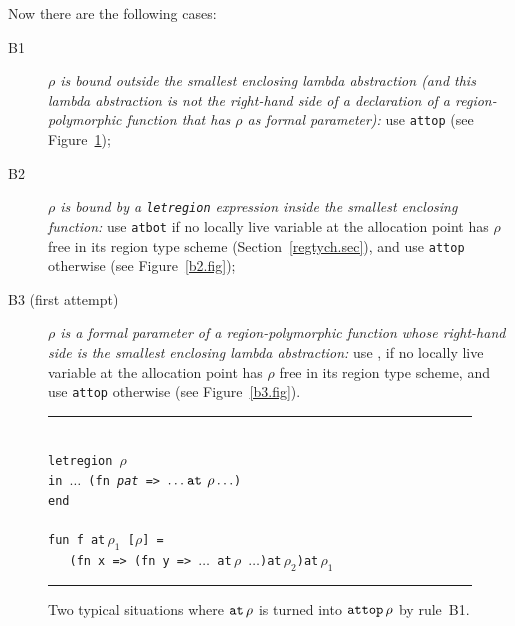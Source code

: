 \documentclass[12pt]{book}
\begin{document}
Now there are the following cases:
\begin{description}
\item[B1] {\it $\rho$ is bound outside the smallest enclosing lambda abstraction
      (and this lambda abstraction is not the right-hand side of a 
      declaration of a region-polymorphic function that has $\rho$ as
      formal parameter):}
      use {\tt attop} (see Figure~\ref{b1.fig});
\item[B2]{\it $\rho$ is bound by a {\tt letregion} expression inside the
      smallest enclosing function:} use {\tt atbot} if no locally live
      variable at the allocation point has $\rho$ free in its region 
      type scheme (Section~\ref{regtych.sec}), and use {\tt attop} otherwise 
      (see Figure~\ref{b2.fig});
    \item[B3 (first attempt)]{\it $\rho$ is a formal parameter of a
        region-polymorphic function whose right-hand side is the
        smallest enclosing lambda abstraction:} use , if no locally live variable at the
      allocation point has $\rho$ free in its region type scheme, and
      use {\tt attop} otherwise (see Figure~\ref{b3.fig}).
\end{description}
\begin{figure}
\hrule
\begin{center}
\begin{tabbing}
\\
\hskip3cm\=\tt letregion $\rho$\\
       \>\tt in $\ldots$ (fn {\it pat} => $\ldots\mathbin{\hbox{\tt at}}\,\rho\ldots$)\\
       \>\tt end\\
\\
       \>\tt fun f at$\,\rho_1$ [$\rho$] =\\
       \>\tt\ \ \ (fn x => (fn y => $\ldots$ at$\,\rho$ $\ldots$)at$\,\rho_2$)at$\,\rho_1$\\
\end{tabbing}
\end{center}
\caption{Two typical situations where $\mathbin{\hbox{\tt at}}\,\rho$ is turned into $\hbox{\tt attop}\,\rho$
by rule~B1.}
\medskip

\hrule
\label{b1.fig}
\end{figure}
\end{document}
